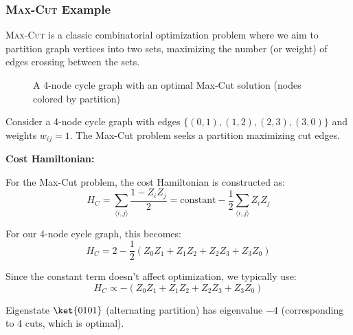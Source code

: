 \subsubsection*{\textsc{Max-Cut} Example}

\textsc{Max-Cut} is a classic combinatorial optimization problem where we aim
to partition graph vertices into two sets, maximizing the number (or weight)
of edges crossing between the sets.

\begin{figure}[H]
  \centering
  \caption{A 4-node cycle graph with an optimal Max-Cut solution (nodes
  colored by partition)}
  \label{fig:max-cut-example}
\end{figure}

Consider a 4-node cycle graph with edges $\{(0,1), (1,2), (2,3), (3,0)\}$ and
weights $w_{ij} = 1$. The Max-Cut problem seeks a partition maximizing cut
edges.

\vspace{0.3cm}

\noindent
\textbf{Cost Hamiltonian:}

For the Max-Cut problem, the cost Hamiltonian is constructed as:
\[
  H_C = \sum_{\langle i,j \rangle} \frac{1 - Z_i Z_j}{2} = \text{constant} -
  \frac{1}{2}\sum_{\langle i,j \rangle} Z_i Z_j
\]

For our 4-node cycle graph, this becomes:
\[
  H_C = 2 - \frac{1}{2}(Z_0 Z_1 + Z_1 Z_2 + Z_2 Z_3 + Z_3 Z_0)
\]

Since the constant term doesn't affect optimization, we typically use:
\[
  H_C \propto -(Z_0 Z_1 + Z_1 Z_2 + Z_2 Z_3 + Z_3 Z_0)
\]

Eigenstate $\ket{0101}$ (alternating partition) has eigenvalue $-4$
(corresponding to 4 cuts, which is optimal).

